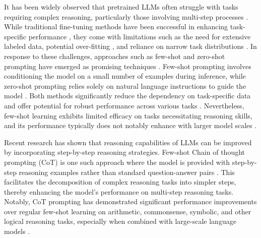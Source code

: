\documentclass[11pt]{article}
\begin{document}
It has been widely observed that pretrained LLMs often struggle with tasks requiring complex reasoning, particularly those involving multi-step processes \cite{language_models_are_few_shot_learners, scaling_language_models_methods_analysis_insights_from_training_gopher, deepspeed}. While traditional fine-tuning methods have been successful in enhancing task-specific performance \cite{rajani-etal-2019-explain-yourself, Verifier_Solve_Math_Word_Problems, Bootstrapping_Reasoning_Reasoning, Scratchpads_Intermediate_Computation_Language_Models}, they come with limitations such as the need for extensive labeled data, potential over-fitting \cite{gururangan-etal-2018-annotation_artifacts_natural_language_inference_data, niven-kao-2019-probing_neural_network_comprehension_natural_language_arguments}, and reliance on narrow task distributions \cite{mccoy_right_for_wrong_reasons_diagnosing_syntactic_heuristics_natural_language_inference}. In response to these challenges, approaches such as few-shot and zero-shot prompting have emerged as promising techniques \cite{reynolds_2021_beyond_the_few_shot_paradigm, language_models_are_few_shot_learners, radford_2018_language_models_unsupervised_multitask_learners}. Few-shot prompting involves conditioning the model on a small number of examples during inference, while zero-shot prompting relies solely on natural language instructions to guide the model \cite{language_models_are_few_shot_learners, radford_2018_language_models_unsupervised_multitask_learners}. Both methods significantly reduce the dependency on task-specific data and offer potential for robust performance across various tasks \cite{reynolds_2021_beyond_the_few_shot_paradigm, language_models_are_few_shot_learners, radford_2018_language_models_unsupervised_multitask_learners}. Nevertheless, few-shot learning exhibits limited efficacy on tasks necessitating reasoning skills, and its performance typically does not notably enhance with larger model scales \cite{liu_2022_pretrain_systematic_survey_of_prompting_methods_natural_language_processing, scaling_language_models_methods_analysis_insights_from_training_gopher}.

Recent research has shown that reasoning capabilities of LLMs can be improved by incorporating step-by-step reasoning strategies. Few-shot Chain of thought prompting (CoT) is one such approach where the model is provided with step-by-step reasoning examples rather than standard question-answer pairs \cite{wei_2022_chain_of_thought_prompting_elicits_reasoning_large_language_models} \cite{self_consistency_improves_chain_thought_reasoning_language_models}. This facilitates the decomposition of complex reasoning tasks into simpler steps, thereby enhancing the model's performance on multi-step reasoning tasks. Notably, CoT prompting has demonstrated significant performance improvements over regular few-shot learning on arithmetic, commonsense, symbolic, and other logical reasoning tasks, especially when combined with large-scale language models \cite{scaling_language_models_methods_analysis_insights_from_training_gopher,wei_2022_chain_of_thought_prompting_elicits_reasoning_large_language_models, self_consistency_improves_chain_thought_reasoning_language_models}. 
\end{document}
